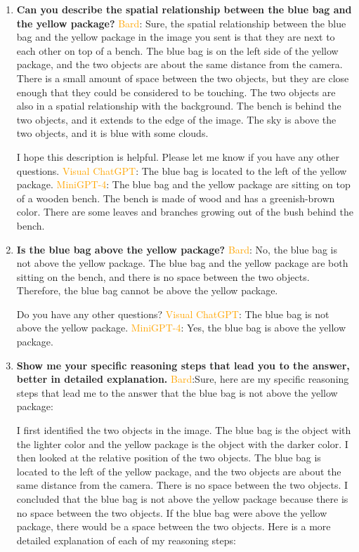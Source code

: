     \begin{enumerate}
        \item \textbf{Can you describe the spatial relationship between the blue bag and the yellow package?}
        \subitem \textcolor{orange}{Bard}: 
        Sure, the spatial relationship between the blue bag and the yellow package in the image you sent is that they are next to each other on top of a bench. The blue bag is on the left side of the yellow package, and the two objects are about the same distance from the camera. There is a small amount of space between the two objects, but they are close enough that they could be considered to be touching.
        The two objects are also in a spatial relationship with the background. The bench is behind the two objects, and it extends to the edge of the image. The sky is above the two objects, and it is blue with some clouds.

        I hope this description is helpful. Please let me know if you have any other questions.
        \subitem \textcolor{orange}{Visual ChatGPT}: The blue bag is located to the left of the yellow package.
        \subitem \textcolor{orange}{MiniGPT-4}: The blue bag and the yellow package are sitting on top of a wooden bench. The bench is made of wood and has a greenish-brown color. There are some leaves and branches growing out of the bush behind the bench.
        \item \textbf{Is the blue bag above the yellow package?}
        \subitem \textcolor{orange}{Bard}: 
        No, the blue bag is not above the yellow package. The blue bag and the yellow package are both sitting on the bench, and there is no space between the two objects. Therefore, the blue bag cannot be above the yellow package.

        Do you have any other questions?
        \subitem \textcolor{orange}{Visual ChatGPT}: The blue bag is not above the yellow package.
        \subitem \textcolor{orange}{MiniGPT-4}: Yes, the blue bag is above the yellow package.
        \item \textbf{Show me your specific reasoning steps that lead you to the answer, better in detailed explanation.}
        \subitem \textcolor{orange}{Bard}:Sure, here are my specific reasoning steps that lead me to the answer that the blue bag is not above the yellow package:

        I first identified the two objects in the image. The blue bag is the object with the lighter color and the yellow package is the object with the darker color.
        I then looked at the relative position of the two objects. The blue bag is located to the left of the yellow package, and the two objects are about the same distance from the camera. There is no space between the two objects.
        I concluded that the blue bag is not above the yellow package because there is no space between the two objects. If the blue bag were above the yellow package, there would be a space between the two objects.
        Here is a more detailed explanation of each of my reasoning steps:
        

\end{enumerate}
